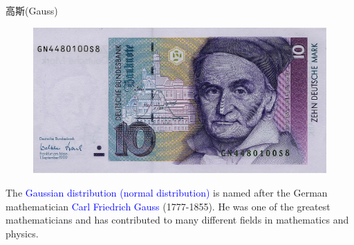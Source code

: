 \documentclass[professionalfont]{beamer}
\newcommand{\blue}[1]{\textcolor{blue}{#1}}
\begin{document}
\begin{frame}{高斯(Gauss)}
\begin{figure}
\includegraphics[width=0.7\linewidth]{Plots/Gauss.jpg}
\end{figure}
The \blue{Gaussian distribution (normal distribution)} is named after the German mathematician \blue{Carl Friedrich Gauss} (1777-1855). He was one of the greatest mathematicians and has contributed to many different fields in mathematics and physics. 
\end{frame}
\end{document}
